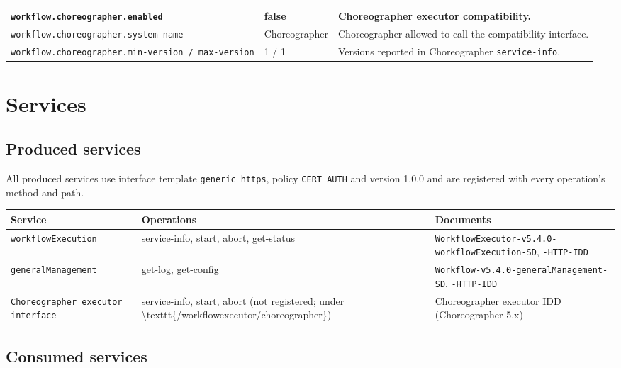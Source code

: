 \documentclass[a4paper]{arrowhead}
\begin{document}
{\begin{longtable}{|p{5.6cm}|p{3.4cm}|p{6.8cm}|}
\texttt{workflow.\allowbreak{}choreographer.\allowbreak{}enabled} & false & Choreographer executor compatibility. \\ \hline
\texttt{workflow.\allowbreak{}choreographer.\allowbreak{}system-\allowbreak{}name} & Choreographer & Choreographer allowed to call the compatibility interface. \\ \hline
\texttt{workflow.\allowbreak{}choreographer.\allowbreak{}min-\allowbreak{}version /\allowbreak{} max-\allowbreak{}version} & 1 / 1 & Versions reported in Choreographer \texttt{service-info}. \\ \hline
\end{longtable}
}


\newpage
\section{Services}
\label{sec:services}
\subsection{Produced services}
All produced services use interface template \texttt{generic\_https}, policy \texttt{CERT\_AUTH} and version 1.0.0 and are
registered with every operation's method and path.

{\small
\begin{longtable}{|p{3.8cm}|p{6.2cm}|p{5.8cm}|}

\hline
\rowcolor{gray!33} Service & Operations & Documents \\ \hline
\endhead
\texttt{workflowExecution} & service-info, start, abort, get-status & \texttt{WorkflowExecutor-v5.4.0-workflowExecution-SD}, \texttt{-HTTP-IDD} \\ \hline
\texttt{generalManagement} & get-log, get-config & \texttt{Workflow-v5.4.0-generalManagement-SD}, \texttt{-HTTP-IDD} \\ \hline
\texttt{Choreographer executor interface} & service-info, start, abort (not registered; under \textbackslash{}texttt\{/workflowexecutor/choreographer\}) & Choreographer executor IDD (Choreographer 5.x) \\ \hline
\end{longtable}
}

\subsection{Consumed services}
\end{document}
